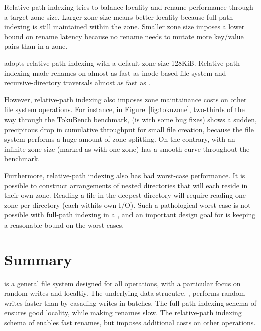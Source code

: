 Relative-path indexing tries to balance locality and rename performance through
a target zone size.
Larger zone size means better locality because full-path indexing is still
maintained within the zone.
Smaller zone size imposes a lower bound on rename latency
because no rename needs to mutate more key/value pairs than in a zone.

\betrfsTwo adopts relative-path-indexing with a default zone size 128KiB.
Relative-path indexing made renames on \betrfsTwo almost as fast as inode-based
file system and recursive-directory traversals almost as fast as \betrfsOne.

However, relative-path indexing also imposes zone maintainance costs on other
file system operations.
For instance, in Figure~\ref{fig:tokuzone},
two-thirds of the way through the TokuBench benchmark,
\betrfsThree (\betrfsThree is \betrfsTwo with some bug fixes) shows a sudden,
precipitous drop in cumulative throughput for small file creation,
because the file system performs a huge amount of zone splitting.
On the contrary, \betrfsThree with an infinite zone size (marked as \betrfsThree
with one zone) has a smooth curve throughout the benchmark.

Furthermore, relative-path indexing also has bad worst-case performance.
It is possible to construct arrangements of nested directories that will each
reside in their own zone.
Reading a file in the deepest directory will require reading one zone per
directory (each withits own I/O).
Such a pathological worst case is not possible with full-path indexing in a
\bet, and an important design goal for \betrfs is keeping a reasonable bound on
the worst cases.

\section{Summary}

\betrfs is a general file system designed for all operations, with a particular
focus on random writes and localtiy.
The underlying data strucutre, \bets, performs random writes faster than \btrees
by casading writes in batches.
The full-path indexing schema of \betrfsOne ensures good locality, while making
renames slow.
The relative-path indexing schema of \betrfsTwo enables fast renames,
but imposes additional costs on other operations.

